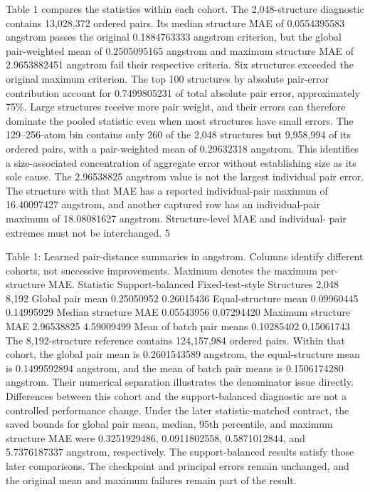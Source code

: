\documentclass[11pt]{article}
\begin{document}
Table 1 compares the statistics within each cohort. The 2,048-structure diagnostic contains 13,028,372
ordered pairs. Its median structure MAE of 0.0554395583 angstrom passes the original 0.1884763333
angstrom criterion, but the global pair-weighted mean of 0.2505095165 angstrom and maximum
structure MAE of 2.9653882451 angstrom fail their respective criteria. Six structures exceeded the
original maximum criterion.
The top 100 structures by absolute pair-error contribution account for 0.7499805231 of total
absolute pair error, approximately 75\%. Large structures receive more pair weight, and their errors
can therefore dominate the pooled statistic even when most structures have small errors. The
129–256-atom bin contains only 260 of the 2,048 structures but 9,958,994 of its ordered pairs, with
a pair-weighted mean of 0.29632318 angstrom. This identifies a size-associated concentration of
aggregate error without establishing size as its sole cause.
The 2.96538825 angstrom value is not the largest individual pair error. The structure with that
MAE has a reported individual-pair maximum of 16.40097427 angstrom, and another captured row
has an individual-pair maximum of 18.08081627 angstrom. Structure-level MAE and individual-
pair extremes must not be interchanged.
5

Table 1: Learned pair-distance summaries in angstrom. Columns identify different cohorts, not
successive improvements. Maximum denotes the maximum per-structure MAE.
Statistic Support-balanced Fixed-test-style
Structures 2,048 8,192
Global pair mean 0.25050952 0.26015436
Equal-structure mean 0.09960445 0.14995929
Median structure MAE 0.05543956 0.07294420
Maximum structure MAE 2.96538825 4.59009499
Mean of batch pair means 0.10285402 0.15061743
The 8,192-structure reference contains 124,157,984 ordered pairs. Within that cohort, the global
pair mean is 0.2601543589 angstrom, the equal-structure mean is 0.1499592894 angstrom, and the
mean of batch pair means is 0.1506174280 angstrom. Their numerical separation illustrates the
denominator issue directly. Differences between this cohort and the support-balanced diagnostic
are not a controlled performance change.
Under the later statistic-matched contract, the saved bounds for global pair mean, median, 95th
percentile, and maximum structure MAE were 0.3251929486, 0.0911802558, 0.5871012844, and
5.7376187337 angstrom, respectively. The support-balanced results satisfy those later comparisons.
The checkpoint and principal errors remain unchanged, and the original mean and maximum failures
remain part of the result.
\end{document}
